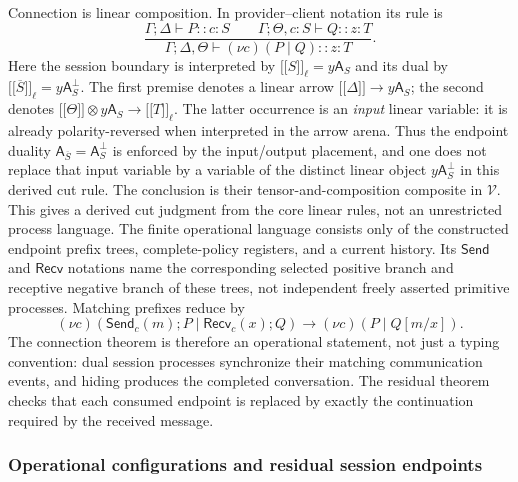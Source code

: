 \documentclass[11pt,a4paper]{article}
\numberwithin{equation}{section}
\theoremstyle{definition}
\theoremstyle{remark}
\theoremstyle{plain}
\providecommand{\cV}{\mathcal{V}}
\providecommand{\llbracket}{\mathopen{[\![}}
\providecommand{\rrbracket}{\mathclose{]\!]}}
\providecommand{\sem}[1]{\llbracket #1\rrbracket}
\providecommand{\Send}{\mathsf{Send}}
\providecommand{\Recv}{\mathsf{Recv}}
\begin{document}
Connection is linear composition. In provider--client notation its rule is
\begin{equation}
 \frac{\Gamma;\Delta\vdash P::c:S\qquad
       \Gamma;\Theta,c:S\vdash Q::z:T}
      {\Gamma;\Delta,\Theta\vdash(\nu c)(P\mid Q)::z:T}.
 \label{agt-eq-session-cut}
\end{equation}
Here the session boundary is interpreted by
$\sem S_\ell=y\mathsf A_S$ and its dual by
$\sem{\overline S}_\ell=y\mathsf A_S^\perp$.
The first premise denotes a linear arrow
$\sem\Delta\to y\mathsf A_S$; the second denotes
$\sem\Theta\otimes y\mathsf A_S\to\sem T_\ell$.
The latter occurrence is an \emph{input} linear variable: it is already
polarity-reversed when interpreted in the arrow arena.  Thus the
endpoint duality $\mathsf A_{\overline S}=\mathsf A_S^\perp$
is enforced by the input/output placement, and one does not replace
that input variable by a variable of the distinct linear object
$y\mathsf A_S^\perp$ in this derived cut rule.
The conclusion is their tensor-and-composition composite in $\cV$.
This gives a derived cut judgment from the core linear rules, not an
unrestricted process language. The finite operational language consists
only of the constructed endpoint prefix trees, complete-policy registers,
and a current history. Its $\Send$ and $\Recv$ notations name the
corresponding selected positive branch and receptive negative branch of
these trees, not independent freely asserted primitive processes.
Matching prefixes reduce by
\begin{equation}
 (\nu c)(\Send_c(m);P\mid\Recv_c(x);Q)
 \longrightarrow(\nu c)(P\mid Q[m/x]).
 \label{agt-eq-send-reduction}
\end{equation}
The connection theorem is therefore an operational statement, not
just a typing convention: dual session processes synchronize their
matching communication events, and hiding produces the completed
conversation. The residual theorem checks that each consumed endpoint
is replaced by exactly the continuation required by the received
message.

\subsubsection{Operational configurations and residual session endpoints}
\label{agt-sec-session-residual}
\end{document}
